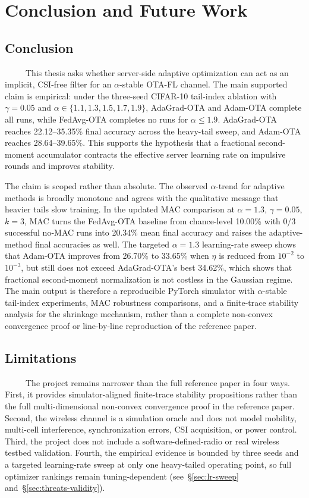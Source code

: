 \chapter{Conclusion and Future Work}

\section{Conclusion}
\ \ \ \ \, This thesis asks whether server-side adaptive optimization can act
as an implicit, CSI-free filter for an $\alpha$-stable OTA-FL channel.
The main supported claim is empirical: under the three-seed CIFAR-10
tail-index ablation with $\gamma=0.05$ and $\alpha\in\{1.1,1.3,1.5,
1.7,1.9\}$, AdaGrad-OTA and Adam-OTA complete all runs, while
FedAvg-OTA completes no runs for $\alpha\leq1.9$. AdaGrad-OTA reaches
22.12--35.35\% final accuracy across the heavy-tail sweep, and
Adam-OTA reaches 28.64--39.65\%. This supports the hypothesis that a
fractional second-moment accumulator contracts the effective server
learning rate on impulsive rounds and improves stability.

The claim is scoped rather than absolute. The observed $\alpha$-trend
for adaptive methods is broadly monotone and agrees with the qualitative
message that heavier tails slow training. In the updated MAC comparison at
$\alpha=1.3$, $\gamma=0.05$, $k=3$, MAC turns the FedAvg-OTA baseline from
chance-level 10.00\% with 0/3 successful no-MAC runs into 20.34\% mean final
accuracy and raises the adaptive-method final accuracies as well. The targeted
$\alpha=1.3$ learning-rate sweep shows that Adam-OTA improves from 26.70\% to
33.65\% when $\eta$ is reduced from
$10^{-2}$ to $10^{-3}$, but still does not exceed AdaGrad-OTA's best
34.62\%, which shows that fractional second-moment
normalization is not costless in the Gaussian regime.
The main output is therefore a reproducible PyTorch simulator with
$\alpha$-stable tail-index experiments, MAC robustness comparisons,
and a finite-trace stability analysis for the shrinkage mechanism,
rather than a complete non-convex convergence proof or line-by-line
reproduction of the reference paper.

\section{Limitations}
\ \ \ \ \, The project remains narrower than the full reference paper in four
ways. First, it provides simulator-aligned finite-trace stability
propositions rather than the full multi-dimensional non-convex
convergence proof in the reference paper. Second, the wireless
channel is a simulation oracle and does not model mobility, multi-cell
interference, synchronization errors, CSI acquisition, or power
control. Third, the project does not include a software-defined-radio
or real wireless testbed validation. Fourth, the empirical evidence is
bounded by three seeds and a targeted learning-rate sweep at only one
heavy-tailed operating point, so full optimizer rankings remain
tuning-dependent (see~\S\ref{sec:lr-sweep} and~\S\ref{sec:threats-validity}).

